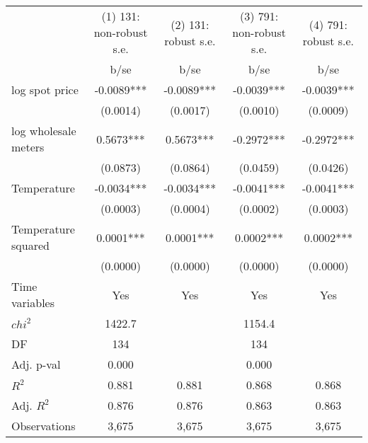 \begin{tabular}{lcccc}\toprule
                    &(1) 131: non-robust s.e.   &(2) 131: robust s.e.   &(3) 791: non-robust s.e.   &(4) 791: robust s.e.   \\
                    &        b/se   &        b/se   &        b/se   &        b/se   \\
\midrule
log spot price      &     -0.0089***&     -0.0089***&     -0.0039***&     -0.0039***\\
                    &    (0.0014)   &    (0.0017)   &    (0.0010)   &    (0.0009)   \\
log wholesale meters&      0.5673***&      0.5673***&     -0.2972***&     -0.2972***\\
                    &    (0.0873)   &    (0.0864)   &    (0.0459)   &    (0.0426)   \\
Temperature         &     -0.0034***&     -0.0034***&     -0.0041***&     -0.0041***\\
                    &    (0.0003)   &    (0.0004)   &    (0.0002)   &    (0.0003)   \\
Temperature squared &      0.0001***&      0.0001***&      0.0002***&      0.0002***\\
                    &    (0.0000)   &    (0.0000)   &    (0.0000)   &    (0.0000)   \\
Time variables      &         Yes   &         Yes   &         Yes   &         Yes   \\
\midrule
\(chi^2\)           &      1422.7   &               &      1154.4   &               \\
DF                  &         134   &               &         134   &               \\
Adj. p-val          &       0.000   &               &       0.000   &               \\
\(R^2\)             &       0.881   &       0.881   &       0.868   &       0.868   \\
Adj. \(R^2\)        &       0.876   &       0.876   &       0.863   &       0.863   \\
Observations        &       3,675   &       3,675   &       3,675   &       3,675   \\
\bottomrule\end{tabular}
